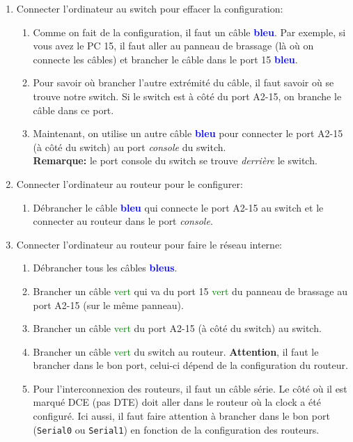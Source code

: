 \documentclass[a4paper]{article}
\begin{document}
\begin{itemize}
\begin{enumerate}


    \item Connecter l'ordinateur au switch pour effacer la configuration:
    \begin{enumerate}
        \item Comme on fait de la configuration, il faut un câble \textcolor{blue}{\textbf{bleu}}. Par exemple, si vous avez le PC 15, il faut aller au panneau de brassage (là où on connecte les câbles) et brancher le câble dans le port 15 \textcolor{blue}{\textbf{bleu}}.
        \item Pour savoir où brancher l'autre extrémité du câble, il faut savoir où se trouve notre switch. Si le switch est à côté du port A2-15, on branche le câble dans ce port.
        \item Maintenant, on utilise un autre câble \textcolor{blue}{\textbf{bleu}} pour connecter le port A2-15 (à côté du switch) au port \textit{console} du switch. \\
        \textbf{Remarque:} le port console du switch se trouve \textit{derrière} le switch.
    \end{enumerate}


    \item Connecter l'ordinateur au routeur pour le configurer:
    \begin{enumerate}
        \item Débrancher le câble \textcolor{blue}{\textbf{bleu}} qui connecte le port A2-15 au switch et le connecter au routeur dans le port \textit{console}.
    \end{enumerate}


    \item Connecter l'ordinateur au routeur pour faire le réseau interne:
    \begin{enumerate}
        \item Débrancher tous les câbles \textcolor{blue}{\textbf{bleus}}.
        \item Brancher un câble \textcolor{green}{vert} qui va du port 15 \textcolor{green}{vert} du panneau de brassage au port A2-15 (sur le même panneau).
        \item Brancher un câble \textcolor{green}{vert} du port A2-15 (à côté du switch) au switch.
        \item Brancher un câble \textcolor{green}{vert} du switch au routeur. \textbf{Attention}, il faut le brancher dans le bon port, celui-ci dépend de la configuration du routeur.
        \item Pour l'interconnexion des routeurs, il faut un câble série. Le côté où il est marqué DCE (pas DTE) doit aller dans le routeur où la clock a été configuré. Ici aussi, il faut faire attention à brancher dans le bon port (\texttt{Serial0} ou \texttt{Serial1}) en fonction de la configuration des routeurs.
    \end{enumerate}



\end{enumerate}
\end{itemize}
\end{document}
